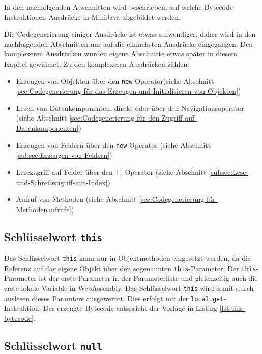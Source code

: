 In den nachfolgenden Abschnitten wird beschrieben, auf welche Bytecode-Instruktionen Ausdrücke in MiniJava abgebildet werden.

Die Codegenerierung einiger Ausdrücke ist etwas aufwendiger, daher wird in den nachfolgenden Abschnitten nur auf die einfachsten Ausdrücke eingegangen. Den komplexeren Ausdrücken wurden eigene Abschnitte etwas später in diesem Kapitel gewidmet. Zu den komplexeren Ausdrücken zählen: 
\begin{itemize}
    \item Erzeugen von Objekten über den \lstinline{new}-Operator(siehe Abschnitt \ref{sec:Codegenerierung-für-das-Erzeugen-und-Initialisieren-von-Objekten})
    \item Lesen von Datenkomponenten, direkt oder über den Navigationsoperator (siehe Abschnitt \ref{sec:Codegenerierung-für-den-Zugriff-auf-Datenkomponenten})
    \item Erzeugen von Feldern über den \lstinline{new}-Operator (siehe Abschnitt \ref{subsec:Erzeugen-von-Feldern})
    \item Lesezugriff auf Felder über den \lstinline{[]}-Operator (siehe Abschnitt \ref{subsec:Lese-und-Schreibzugriff-mit-Index})
    \item Aufruf von Methoden (siehe Abschnitt \ref{sec:Codegenerierung-für-Methodenaufrufe})
\end{itemize}

\subsection{Schlüsselwort \lstinline{this}}

Das Schlüsselwort \lstinline{this} kann nur in Objektmethoden eingesetzt werden, da die Referenz auf das eigene Objekt über den sogenannten \lstinline{this}-Parameter. Der \lstinline{this}-Parameter ist der erste Parameter in der Parameterliste und gleichzeitig auch die erste lokale Variable in WebAssembly. Das Schlüsselwort \lstinline{this} wird somit durch auslesen dieses Paramters ausgewertet. Dies erfolgt mit der \lstinline{local.get}-Instruktion. Der erzeugte Bytecode entspricht der Vorlage in Listing \ref{lst:this-bytecode}.



\subsection{Schlüsselwort \lstinline{null}}

